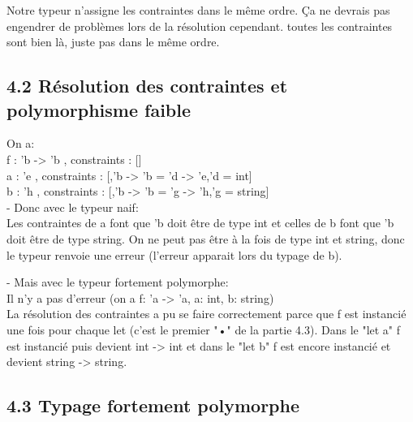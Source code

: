 \documentclass{article}
\begin{document}
{
  Notre typeur n'assigne les contraintes dans le même ordre. Ça ne 
  devrais pas engendrer de problèmes lors de la résolution cependant. toutes les
  contraintes sont bien là, juste pas dans le même ordre.
}
{}

\subsection{4.2 Résolution des contraintes et polymorphisme faible}

{}
{}

{
  On a:\\
  f : 'b -> 'b  , constraints : []\\
  a : 'e        , constraints : [,'b -> 'b = 'd -> 'e,'d = int]\\
  b : 'h        , constraints : [,'b -> 'b = 'g -> 'h,'g = string]\\

  - Donc avec le typeur naif:\\
  Les contraintes de a font que 'b doit être de type int et celles de b font que
  'b doit être de type string. On ne peut pas être à la fois de type int et
  string, donc le typeur renvoie une erreur (l'erreur apparait lors du typage de b).

  - Mais avec le typeur fortement polymorphe:\\
  Il n'y a pas d'erreur (on a f: 'a -> 'a, a: int, b: string)\\
  La résolution des contraintes a pu se faire correctement parce que f est 
  instancié une fois pour chaque let (c'est le premier "•" de la partie 4.3).
  Dans le "let a" f est instancié puis devient int -> int et dans le "let b" f est 
  encore instancié et devient string -> string.

}
{}

{}
{}

\subsection{4.3 Typage fortement polymorphe}
\end{document}
